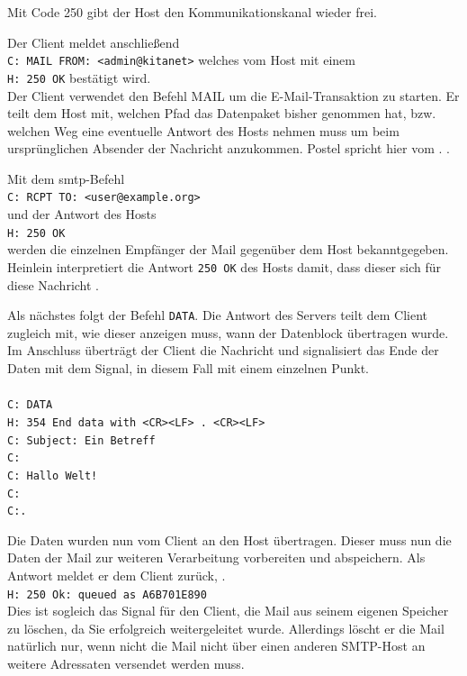 Mit Code 250  \citep[][38]{rfc821} gibt der Host den Kommunikationskanal wieder frei.

Der Client meldet anschließend \\
\verb+C: MAIL FROM: <admin@kitanet>+ welches vom Host mit einem \\
\verb+H: 250 OK+ bestätigt wird.\\
Der Client verwendet den Befehl MAIL um die E-Mail-Transaktion zu starten. Er teilt dem Host mit, welchen Pfad das Datenpaket bisher genommen hat, bzw. welchen Weg eine eventuelle Antwort des Hosts nehmen muss um beim ursprünglichen Absender der Nachricht anzukommen. Postel spricht hier vom . \citep[vgl.][20]{rfc821}.

Mit dem \ac{smtp}-Befehl\\
\verb+C: RCPT TO: <user@example.org>+ \\ 
und der Antwort des Hosts \\
\verb+H: 250 OK+\\
werden die einzelnen Empfänger der Mail gegenüber dem Host bekanntgegeben. Heinlein interpretiert die Antwort \verb+250 OK+ des Hosts damit, dass dieser sich für diese Nachricht  \citep[vgl.][25]{Heinlein2004}.

Als nächstes folgt der Befehl \verb+DATA+. Die Antwort des Servers teilt dem Client zugleich mit, wie dieser anzeigen muss, wann der Datenblock übertragen wurde. Im Anschluss überträgt der Client die Nachricht und signalisiert das Ende der Daten mit dem Signal, in diesem Fall mit einem einzelnen Punkt.\\
\\
\verb+C: DATA+ \\
\verb+H: 354 End data with <CR><LF> . <CR><LF>+\\
\verb+C: Subject: Ein Betreff+ \\
\verb+C:+\\
\verb+C: Hallo Welt!+ \\
\verb+C:+\\ 
\verb+C:.+

Die Daten wurden nun vom Client an den Host übertragen. Dieser muss nun die Daten der Mail zur weiteren Verarbeitung vorbereiten und abspeichern. Als Antwort meldet er dem Client zurück,  \citep[][25]{Heinlein2004}.\\
\verb+H: 250 Ok: queued as A6B701E890+ \\
Dies ist sogleich das Signal für den Client, die Mail aus seinem eigenen Speicher zu löschen, da Sie erfolgreich weitergeleitet wurde. Allerdings löscht er die Mail natürlich nur, wenn nicht die Mail nicht über einen anderen SMTP-Host an weitere Adressaten versendet werden muss.

